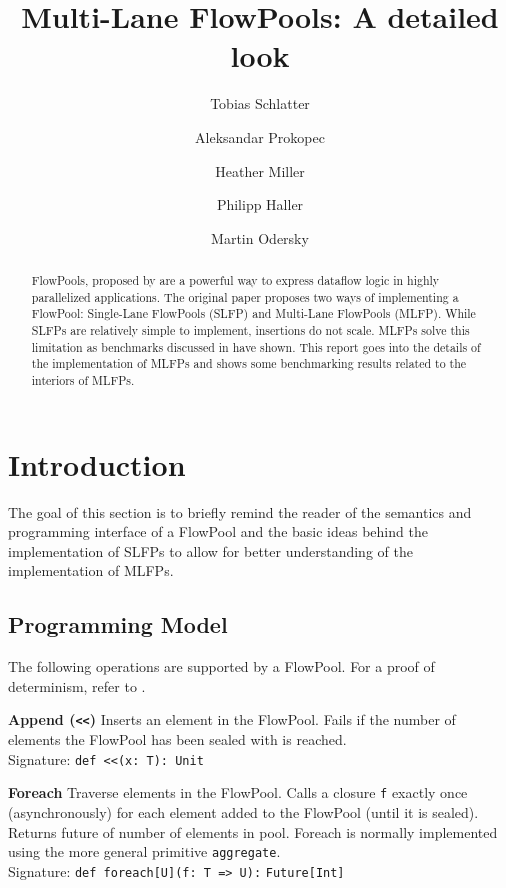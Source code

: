 \documentclass[runningheads,a4paper,fleqn]{llncs}
\begin{document}
\title{Multi-Lane FlowPools: A detailed look}
\author{Tobias Schlatter \and Aleksandar Prokopec \and
  Heather Miller \and Philipp Haller \and Martin
  Odersky}



\maketitle

\begin{abstract}
  FlowPools, proposed by \cite{FP12} are a powerful way to express
  dataflow logic in highly parallelized applications. The original
  paper proposes two ways of implementing a FlowPool: Single-Lane
  FlowPools (SLFP) and Multi-Lane FlowPools (MLFP). While SLFPs are
  relatively simple to implement, insertions do not scale. MLFPs solve
  this limitation as benchmarks discussed in \cite{FP12} have
  shown. This report goes into the details of the implementation of
  MLFPs and shows some benchmarking results related to the interiors
  of MLFPs.
\end{abstract}

\section{Introduction}
The goal of this section is to briefly remind the reader of the
semantics and programming interface of a FlowPool and the basic ideas
behind the implementation of SLFPs to allow for better understanding
of the implementation of MLFPs.

\subsection{Programming Model}
The following operations are supported by a FlowPool. For a proof of
determinism, refer to \cite{FP12}.

\textbf{Append (\texttt{<<})} Inserts an element in the
FlowPool. Fails if the number of elements the FlowPool has been sealed
with is reached.\\
Signature: \verb+def <<(x: T): Unit+

\textbf{Foreach} Traverse elements in the FlowPool. Calls a closure
\verb+f+ exactly once (asynchronously) for each element added to the
FlowPool (until it is sealed). Returns future of number of elements in
pool. Foreach is normally implemented using the more general primitive
\verb+aggregate+.\\
Signature: \verb+def foreach[U](f: T => U):+ \verb+Future[Int]+
\end{document}
